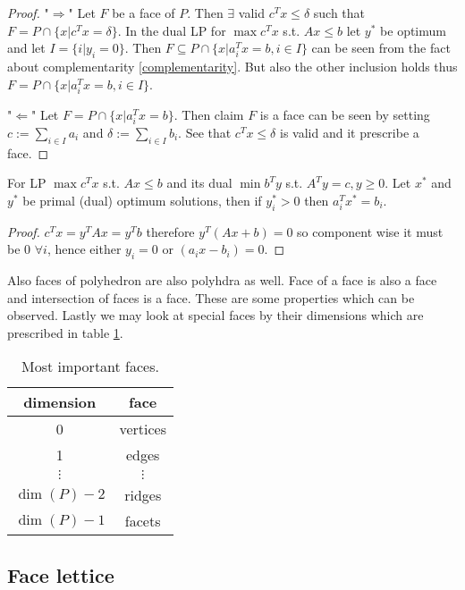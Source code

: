\begin{proof}
	"$\Rightarrow$" Let $F$ be a face of $P$. Then $\exists$ valid $c^{T} x \leq \delta$ such that $F = P \cap \{x | c^{T} x = \delta\}$. In the dual LP for $\max c^{T} x$ s.t. $A x \leq b$ let $y^{\ast}$ be optimum and let $I = \{i | y_{i} = 0\}$. Then $F \subseteq P \cap \{x | a_{i}^{T} x = b, i \in I\}$ can be seen from the fact about complementarity \ref{complementarity}. But also the other inclusion holds thus  $F = P \cap \{x | a_{i}^{T} x = b, i \in I\}$.
	
	"$\Leftarrow$" Let $F = P \cap \{x | a_{i}^{T} x = b\}$. Then claim $F$ is a face can be seen by setting $c := \sum_{i \in I} a_{i}$ and $\delta := \sum_{i \in I} b_{i}$. See that $c^{T} x \leq \delta$ is valid and it prescribe a face.
\end{proof}

\begin{fact}[Complementarity]\label{complementarity}
	For LP $\max c^{T}x$ s.t. $A x \leq b$ and its dual $\min b^{T} y$ s.t. $A^{T} y = c, y \geq 0$. Let $x^{\ast}$ and $y^{\ast}$ be primal (dual) optimum solutions, then if $y_{i}^{\ast} > 0$ then $a_{i}^{T} x^{\ast} = b_{i}$.
\end{fact}

\begin{proof}
	$c^{T}x = y^{T}Ax = y^{T}b$ therefore $y^{T}(Ax + b) = 0$ so component wise it must be 0 $\forall i$, hence either $y_{i} = 0$ or $(a_{i}x - b_{i}) =0$.
\end{proof}

Also faces of polyhedron are also polyhdra as well. Face of a face is also a face and intersection of faces is a face. These are some properties which can be observed. Lastly we may look at special faces by their dimensions which are prescribed in table \ref{faces}.

\begin{table}[!ht]\centering
	\begin{tabular}{c|c}
		dimension & face \\
		\hline
		0 & vertices \\
		1 & edges \\
		$\vdots$ & $\vdots$ \\
		$\dim(P) - 2$ & ridges \\
		$\dim(P) - 1$ & facets
	\end{tabular}
	\caption{Most important faces.}
	\label{faces}
\end{table}

\subsection{Face lettice}

